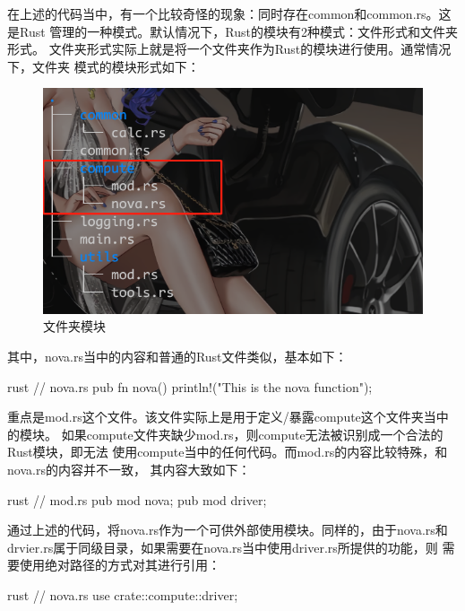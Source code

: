 在上述的代码当中，有一个比较奇怪的现象：同时存在common和common.rs。这是Rust
管理的一种模式。默认情况下，Rust的模块有2种模式：文件形式和文件夹形式。
文件夹形式实际上就是将一个文件夹作为Rust的模块进行使用。通常情况下，文件夹
模式的模块形式如下：
\begin{figure}[H]
  \centering
  \includegraphics[width=\linewidth]{rust_mod_directory.png}
  \caption{文件夹模块}
  \label{fig:rust_mod_directory}
\end{figure}
其中，nova.rs当中的内容和普通的Rust文件类似，基本如下：
\begin{code-block}{rust}
// nova.rs
pub fn nova() {
    println!("This is the nova function");
}
\end{code-block}
重点是mod.rs这个文件。该文件实际上是用于定义/暴露compute这个文件夹当中的模块。
如果compute文件夹缺少mod.rs，则compute无法被识别成一个合法的Rust模块，即无法
使用compute当中的任何代码。而mod.rs的内容比较特殊，和nova.rs的内容并不一致，
其内容大致如下：
\begin{code-block}{rust}
// mod.rs
pub mod nova;
pub mod driver;
\end{code-block}
通过上述的代码，将nova.rs作为一个可供外部使用模块。同样的，由于nova.rs和
drvier.rs属于同级目录，如果需要在nova.rs当中使用driver.rs所提供的功能，则
需要使用绝对路径的方式对其进行引用：
\begin{code-block}{rust}
// nova.rs
use crate::compute::driver;
\end{code-block}

